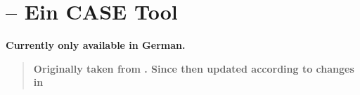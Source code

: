 %
%
%


\chapter{\icewing{} -- Ein CASE Tool}

\begin{center}
  \vspace{-0.5cm}
  \Large \textbf{Currently only available in German.}
  \vspace{0.1cm}
\end{center}

\begin{quote}
  \textbf{Originally taken from \cite[Anhang B]{Loemker2004-LVO}.
  Since then updated according to changes in \icewing{}}
\end{quote}

